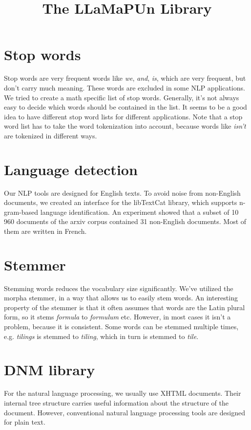 \documentclass[12pt]{article}
\title{The LLaMaPUn Library}
\begin{document}
\maketitle
\newcommand{\word}[1]{\emph{#1}}

\section{Stop words}
Stop words are very frequent words like \word{we}, \word{and}, \word{is}, which are very frequent, but don't carry much meaning.
These words are excluded in some NLP applications.
We tried to create a math specific list of stop words.
Generally, it's not always easy to decide which words should be contained in the list.
It seems to be a good idea to have different stop word lists for different applications.
Note that a stop word list has to take the word tokenization into account, because words like \word{isn't} are tokenized in different ways.

\section{Language detection}
Our NLP tools are designed for English texts.
To avoid noise from non-English documents, we created an interface for the libTextCat library, which supports n-gram-based language identification.
An experiment showed that a subset of 10 960 documents of the arxiv corpus contained 31 non-English documents. Most of them are written in French.

\section{Stemmer}
Stemming words reduces the vocabulary size significantly. We've utilized the morpha stemmer, in a way that allows us to easily stem words.
An interesting property of the stemmer is that it often assumes that words are the Latin plural form, so it stems \word{formula} to \word{formulum} etc.
However, in most cases it isn't a problem, because it is consistent.
Some words can be stemmed multiple times, e.g. \word{tilings} is stemmed to \word{tiling}, which in turn is stemmed to \word{tile}.


\section{DNM library}
For the natural language processing, we usually use XHTML documents.
Their internal tree structure carries useful information about the structure of the document.
However, conventional natural language processing tools are designed for plain text.
\end{document}
